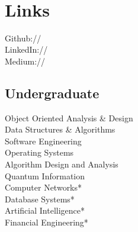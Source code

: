 \documentclass[]{deedy-resume-openfont}
\begin{document}
\begin{minipage}[t]{0.30\textwidth}
 \\

\sectionsep



\section{Links} 
Github:// \href{https://github.com/anshulahuja98}{} \\
LinkedIn://  \href{https://www.linkedin.com/in/anshul-ahuja}{} \\
Medium://  \href{https://medium.com/@anshul.ahu/}{} \\
\href{https://scholar.google.com/citations?hl=en&user=jPd1-ygAAAAJ}{}

\sectionsep


\subsection{Undergraduate}
Object Oriented Analysis \& Design  \\
Data Structures \& Algorithms  \\
Software Engineering  \\
Operating Systems \\
Algorithm Design and Analysis \\
Quantum Information \\
Computer Networks* \\
Database Systems* \\
Artificial Intelligence* \\
Financial Engineering* \\


\end{minipage}
\end{document}
